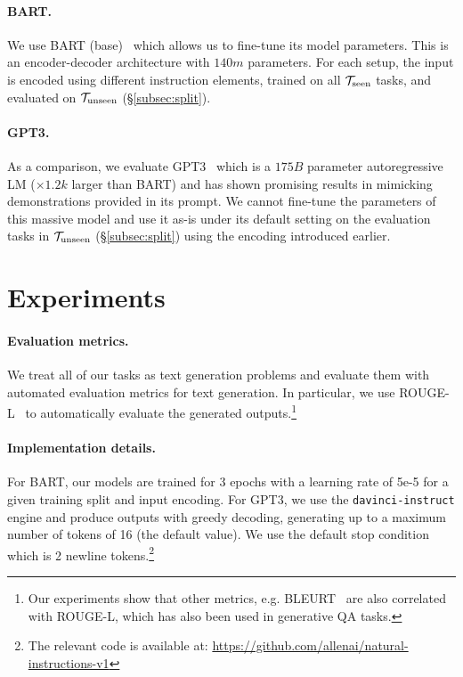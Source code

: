 \paragraph{BART.}
\label{sec:bart}
We use  BART (base)~\cite{lewis2019bart} which allows us to fine-tune its  model parameters. This is an encoder-decoder architecture with $140m$ parameters. For each setup, the input is encoded using different instruction elements,  trained  on all $\mathcal{T}_{\textnormal{seen}}$ tasks, and evaluated  on $\mathcal{T}_{\textnormal{unseen}}$ (\S\ref{subsec:split}). 

\paragraph{GPT3.}
As a comparison, we evaluate GPT3~\cite{brown2020language} which is a $175B$ parameter autoregressive LM ($\times1.2k$ larger than BART) and has shown promising results in mimicking demonstrations provided in its prompt. We cannot fine-tune the parameters of this massive model and use it as-is under its default setting on the evaluation tasks in $\mathcal{T}_{\textnormal{unseen}}$ (\S\ref{subsec:split}) using the  encoding introduced earlier.

\section{Experiments}
\label{sec:experiments}

\paragraph{Evaluation metrics.} We treat all of our tasks as text generation problems and evaluate them with automated evaluation metrics for text generation. In particular, we use ROUGE-L~\cite{lin2004rouge} to automatically evaluate the generated outputs.\footnote{
Our experiments show that other metrics, e.g. BLEURT~\cite{sellam2020bleurt} are also correlated with ROUGE-L, which has also been used in generative QA tasks. }

\paragraph{Implementation details.} For BART, our  models are trained for 3 epochs with a learning rate of 5e-5 for a given training split and input encoding. For GPT3, we use the {\texttt{davinci-instruct}} engine and produce outputs with greedy decoding, generating up to a maximum number of tokens of 16 (the default value). We use the default stop condition which is 2 newline tokens.\footnote{The relevant code is available at:  
\url{https://github.com/allenai/natural-instructions-v1}
}

